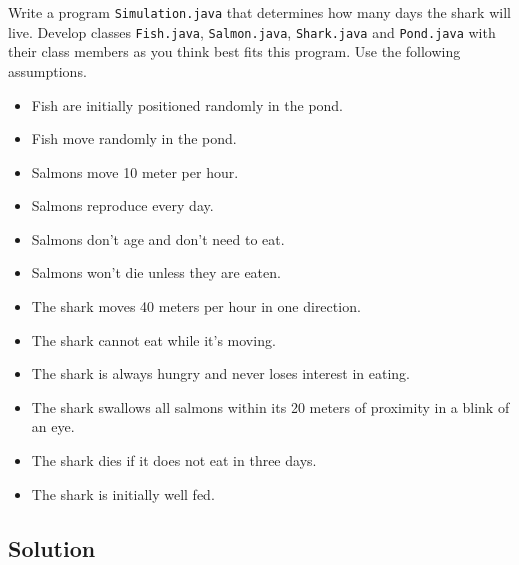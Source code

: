 \documentclass[12pt,letterpaper,twoside]{article}
\begin{document}
Write a program \texttt{Simulation.java} that determines how many days the shark will live. Develop classes \texttt{Fish.java}, \texttt{Salmon.java}, \texttt{Shark.java} and \texttt{Pond.java} with their class members as you think best fits this program. Use the following assumptions.
\begin{itemize}[itemsep=1mm] \parskip=0pt \parsep=0pt
\item[] Fish are initially positioned randomly in the pond.
\item[] Fish move randomly in the pond.
\item[] Salmons move 10 meter per hour.
\item[] Salmons reproduce every day.
\item[] Salmons don't age and don't need to eat.
\item[] Salmons won't die unless they are eaten.
\item[] The shark moves 40 meters per hour in one direction.
\item[] The shark cannot eat while it's moving.
\item[] The shark is always hungry and never loses interest in eating.
\item[] The shark swallows all salmons within its 20 meters of proximity in a blink of an eye.
\item[] The shark dies if it does not eat in three days.
\item[] The shark is initially well fed.
\end{itemize}

\subsection*{Solution}
\end{document}
